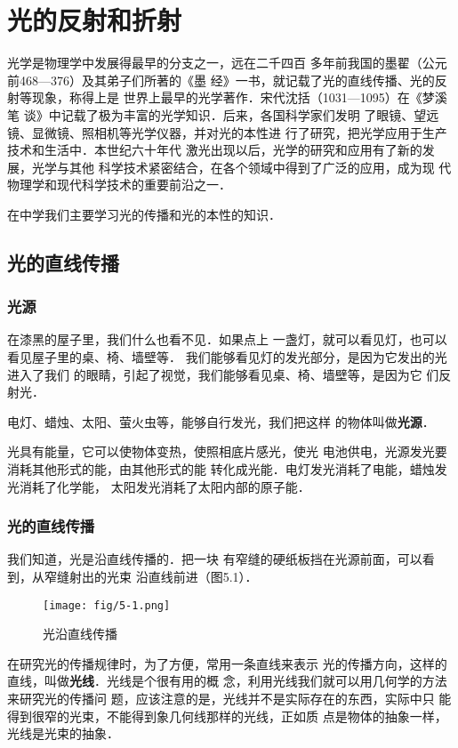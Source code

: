 
\chapter{光的反射和折射}

光学是物理学中发展得最早的分支之一，远在二千四百
多年前我国的墨翟（公元前468—376）及其弟子们所著的《墨
经》一书，就记载了光的直线传播、光的反射等现象，称得上是
世界上最早的光学著作．宋代沈括（1031—1095）在《梦溪笔
谈》中记载了极为丰富的光学知识．后来，各国科学家们发明
了眼镜、望远镜、显微镜、照相机等光学仪器，并对光的本性进
行了研究，把光学应用于生产技术和生活中．本世纪六十年代
激光出现以后，光学的研究和应用有了新的发展，光学与其他
科学技术紧密结合，在各个领域中得到了广泛的应用，成为现
代物理学和现代科学技术的重要前沿之一．

在中学我们主要学习光的传播和光的本性的知识．

\section{光的直线传播}
\subsection{光源}

在漆黑的屋子里，我们什么也看不见．如果点上
一盏灯，就可以看见灯，也可以看见屋子里的桌、椅、墙壁等．
我们能够看见灯的发光部分，是因为它发出的光进入了我们
的眼睛，引起了视觉，我们能够看见桌、椅、墙壁等，是因为它
们反射光．

电灯、蜡烛、太阳、萤火虫等，能够自行发光，我们把这样
的物体叫做\textbf{光源}．

光具有能量，它可以使物体变热，使照相底片感光，使光
电池供电，光源发光要消耗其他形式的能，由其他形式的能
转化成光能．电灯发光消耗了电能，蜡烛发光消耗了化学能，
太阳发光消耗了太阳内部的原子能．

\subsection{光的直线传播}

我们知道，光是沿直线传播的．把一块
有窄缝的硬纸板挡在光源前面，可以看到，从窄缝射出的光束
沿直线前进（图5.1）．
\begin{figure}[htp]\centering
    \texttt{[image: fig/5-1.png]}
    \caption{光沿直线传播}
    \end{figure}

在研究光的传播规律时，为了方便，常用一条直线来表示
光的传播方向，这样的直线，叫做\textbf{光线}．光线是个很有用的概
念，利用光线我们就可以用几何学的方法来研究光的传播问
题，应该注意的是，光线并不是实际存在的东西，实际中只
能得到很窄的光束，不能得到象几何线那样的光线，正如质
点是物体的抽象一样，光线是光束的抽象．

